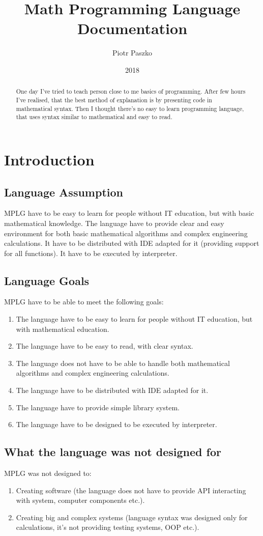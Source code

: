 \documentclass[a4paper]{report}
\title{Math Programming Language Documentation}
\author{Piotr Paszko}
\date{2018}
\begin{document}
\maketitle

\begin{abstract}
One day I've tried to teach person close to me basics of programming. After few hours I've realised, that the best method of explanation is by presenting code in mathematical syntax. Then I thought there's no easy to learn programming language, that uses syntax similar to mathematical and easy to read.
\end{abstract}

\tableofcontents

\chapter{Introduction}
\section{Language Assumption}
MPLG have to be easy to learn for people without IT education, but with basic mathematical knowledge. The language have to provide clear and easy environment for both basic mathematical algorithms and complex engineering calculations. It have to be distributed with IDE adapted for it (providing support for all functions). It have to be executed by interpreter.

\section{Language Goals}
MPLG have to be able to meet the following goals:
\begin{enumerate}
  \item The language have to be easy to learn for people without IT education, but with mathematical education.
  \item The language have to be easy to read, with clear syntax.
  \item The language does not have to be able to handle both mathematical algorithms and complex engineering calculations. 
  \item The language have to be distributed with IDE adapted for it.
  \item The language have to provide simple library system.
  \item The language have to be designed to be executed by interpreter.
\end{enumerate}

\section{What the language was not designed for}
MPLG was not designed to:
\begin{enumerate}
  \item Creating software (the language does not have to provide API interacting with system, computer components etc.).
  \item Creating big and complex systems (language syntax was designed only for calculations, it's not providing testing systems, OOP etc.).
\end{enumerate}
\end{document}
